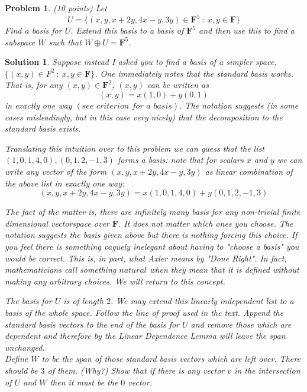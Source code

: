 \documentclass{article}
\theoremstyle{problemstyle}
\newtheorem{problem}{Problem}
\theoremstyle{problemstyle}
\newtheorem{solution}{Solution}
\theoremstyle{problemstyle}
\begin{document}
\begin{problem}
(10 points) Let $$U = \{(x,y,x+2y, 4x-y, 3y) \in \textbf{F}^5 \ : \ x,y \in \textbf{F}\}$$ Find a basis for $U$. Extend this basis to a basis of $\textbf{F}^5$ and then use this to find a subspace $W$ such that $W \oplus U = \textbf{F}^5$.  
\end{problem}

\begin{solution}
Suppose instead I asked you to find a basis of a simpler space, $\{(x,y) \in F^2 \ :  \ x, y \in \textbf{F}\}$. One immediately notes that the standard basis works. That is, for any $(x,y) \in \textbf{F}^2$, $(x,y)$ can be written as $$(x,y) = x(1,0)+y(0,1)$$ in exactly one way $(\textit{see criterion for a basis})$. The notation suggests (in some cases misleadingly, but in this case very nicely) that the decomposition to the standard basis exists. 

Translating this intuition over to this problem we can guess that the list $(1,0,1,4,0),(0,1,2,-1,3)$ forms a basis: note that for scalars $x$ and $y$ we can write any vector of the form $(x,y,x+2y, 4x-y, 3y)$ as linear combination of the above list in exactly one way: $$(x,y,x+2y, 4x-y, 3y) = x(1,0,1,4,0)+ y(0,1,2,-1,3)$$

The fact of the matter is, there are infinitely many basis for any non-trivial finite dimensional vectorspace over $\textbf{F}$. It does not matter which ones you choose. The notation suggests the basis given above but there is nothing forcing this choice. If you feel there is something vaguely inelegant about having to "choose a basis" you would be correct. This is, in part, what Axler means by "Done Right".  In fact, mathematicians call something $\textit{natural}$ when they mean that it is defined without making any arbitrary choices. We will return to this concept. 

The basis for $U$ is of length $2$. We may extend this linearly independent list to a basis of the whole space. Follow the line of proof used in the text. Append the standard basis vectors to the end of the basis for $U$ and remove those which are dependent and therefore by the Linear Dependence Lemma will leave the span unchanged.\\

Define $W$ to be the span of those standard basis vectors which are left over. There should be $3$ of them. (Why?)  Show that if there is any vector $v$ in the intersection of $U$ and $W$ then it must be the $0$ vector. 
\end{solution}
\end{document}
